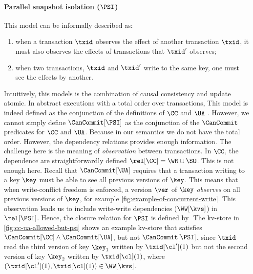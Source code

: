 \paragraph{Parallel snapshot isolation (\(\PSI\))} 
This model can be informally described as:
\begin{enumerate}
\item when a transaction \( \txid \) observes the effect of another transaction \( \txid \),
it must also observes the effects of transactions that \( \txid' \) observes;
\item when two transactions, \( \txid \) and \( \txid'\) write to the same key, one must see the effects by another.
\end{enumerate}
Intuitively, this models is the combination of causal consistency and update atomic.
In abstract executions with a total order over transactions,
This model is indeed defined as the conjunction of the definitions of \(\CC\) and \(\UA\) \citep{framework-concur}. 
However, we cannot simply define \(\CanCommit[\PSI]\) 
as the conjunction of the \(\CanCommit\) predicates for \(\CC\) and \(\UA\). 
Because in our semantics we do not have the total order.
However, the dependency relations provides enough information.
The challenge here is the meaning of \emph{observation} between transactions.
In \( \CC \), the dependence are straightforwardly defined \( \rel[\CC] = \WR \cup \SO\).
This is not enough here.
Recall that \(\CanCommit[\UA]\) requires that a transaction writing to a key \(\key\) 
must be able to see all previous versions of \(\key\). 
This means that when write-conflict freedom is enforced,
a version \(\ver\) of \(\key\) \emph{observes} on all previous versions of \(\key\),
for example \cref{fig:example-of-concurrent-write}.
This observation leads us to include write-write dependencies (\(\WW[\kvs]\)) in \(\rel[\PSI]\). 
Hence, the closure relation for \( \PSI \) is defined by \( \)
The kv-store in \cref{fig:cc-ua-allowed-but-psi} 
shows an example kv-store that satisfies \(\CanCommit[\CC] \land \CanCommit[\UA]\), 
but not \(\CanCommit[\PSI]\),
since \( \txid \) read the third version of key \( \key_1 \) written by \( \txid[\cl'](1) \)
but not the second version of key \( \key_2 \) written by \( \txid[\cl](1)\), 
where \( (\txid[\cl'](1),\txid[\cl](1)) \in \WW[\kvs]\).

